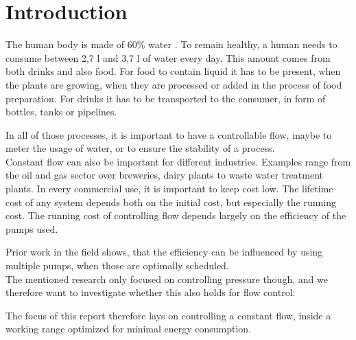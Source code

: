 \chapter{Introduction}\label{ch:introduction}
The human body is made of 60\% water \cite{HumanWater}.
To remain healthy,
a human needs to consume between 2,7 l and 3,7 l of water every day. \cite{DailyWater}
This amount comes from both drinks and also food.
For food to contain liquid it has to be present,
when the plants are growing,
when they are processed or added in the process of food preparation.
For drinks it has to be transported to the consumer,
in form of bottles, tanks or pipelines.

In all of those processes,
it is important to have a controllable flow,
maybe to meter the usage of water,
or to ensure the stability of a process.\\
Constant flow can also be important for different industries.
Examples range from the oil and gas sector\cite{OilFlow} over breweries\cite{BrewFlow},
dairy plants\cite{DairyFlow} to waste water treatment plants\cite{WastewaterFlow}.
In every commercial use,
it is important to keep cost low.
The lifetime cost of any system depends both on the initial cost,
but especially the running cost. \cite{LifetimeCost}
The running cost of controlling flow depends largely on the efficiency of the pumps used.\cite{LifeCycleCostEfficiency}

Prior work in the field shows, that the efficiency can be influenced by using multiple pumps,
when those are optimally scheduled. \cite{YangMultiPump2008}\\
The mentioned research only focused on controlling pressure though,
and we therefore want to investigate whether this also holds for flow control.

The focus of this report therefore lays on controlling a constant flow,
inside a working range optimized for minimal energy consumption.
%
%
%
%
%
%
%
%
%
%
%
%

